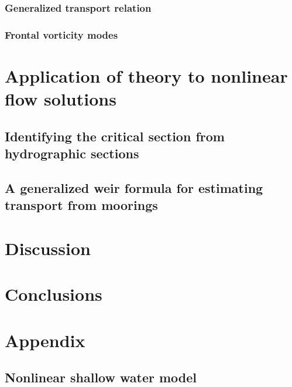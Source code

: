 \documentclass{jfm}
\begin{document}
\subsubsection{Generalized transport relation}

\subsubsection{Frontal vorticity modes}

\section{Application of theory to nonlinear flow solutions}

\subsection{Identifying the critical section from hydrographic sections}

\subsection{A generalized weir formula for estimating transport from moorings}



\section{Discussion}

\section{Conclusions}

\section{Appendix}

\subsection{Nonlinear shallow water model}



\end{document}
